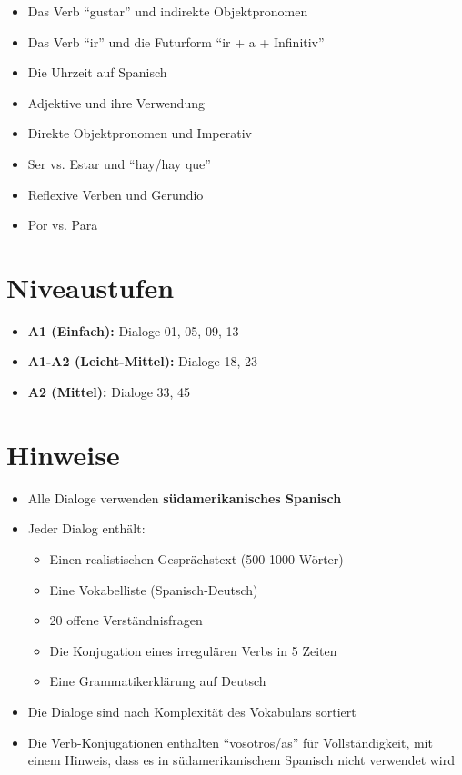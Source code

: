 \documentclass[12pt,a4paper]{article}
\begin{document}
\begin{itemize}
    \item Das Verb \enquote{gustar} und indirekte Objektpronomen
    \item Das Verb \enquote{ir} und die Futurform \enquote{ir + a + Infinitiv}
    \item Die Uhrzeit auf Spanisch
    \item Adjektive und ihre Verwendung
    \item Direkte Objektpronomen und Imperativ
    \item Ser vs. Estar und \enquote{hay/hay que}
    \item Reflexive Verben und Gerundio
    \item Por vs. Para
\end{itemize}

\vspace{2em}

\section*{Niveaustufen}

\begin{itemize}
    \item \textbf{A1 (Einfach):} Dialoge 01, 05, 09, 13
    \item \textbf{A1-A2 (Leicht-Mittel):} Dialoge 18, 23
    \item \textbf{A2 (Mittel):} Dialoge 33, 45
\end{itemize}

\vspace{2em}

\section*{Hinweise}

\begin{itemize}
    \item Alle Dialoge verwenden \textbf{südamerikanisches Spanisch}
    \item Jeder Dialog enthält:
    \begin{itemize}
        \item Einen realistischen Gesprächstext (500-1000 Wörter)
        \item Eine Vokabelliste (Spanisch-Deutsch)
        \item 20 offene Verständnisfragen
        \item Die Konjugation eines irregulären Verbs in 5 Zeiten
        \item Eine Grammatikerklärung auf Deutsch
    \end{itemize}
    \item Die Dialoge sind nach Komplexität des Vokabulars sortiert
    \item Die Verb-Konjugationen enthalten \enquote{vosotros/as} für Vollständigkeit, mit einem Hinweis, dass es in südamerikanischem Spanisch nicht verwendet wird
\end{itemize}
\end{document}
